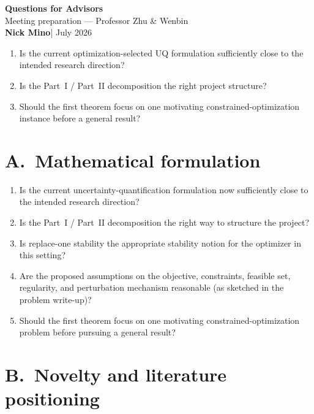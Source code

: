 \documentclass[11pt]{article}
\begin{document}
\begin{center}
{\LARGE\bfseries\color{navy} Questions for Advisors}\\[3pt]
{\normalsize\color{slate} Meeting preparation --- Professor Zhu \& Wenbin}\\[2pt]
{\small\textbf{Nick Mino}\quad\textcolor{accent}{|} July 2026}
\end{center}

\vspace{2pt}

\begin{tcolorbox}[prioritybox, title=Top three (please prioritize)]
\begin{enumerate}[leftmargin=1.4em,itemsep=2pt]
  \item Is the current optimization-selected UQ formulation sufficiently close to the intended research direction?
  \item Is the Part~I / Part~II decomposition the right project structure?
  \item Should the first theorem focus on one motivating constrained-optimization instance before a general result?
\end{enumerate}
\end{tcolorbox}

\section*{A.\ Mathematical formulation}

\begin{enumerate}[leftmargin=1.4em,itemsep=1.5pt]
  \item Is the current uncertainty-quantification formulation now sufficiently close to the intended research direction?
  \item Is the Part~I / Part~II decomposition the right way to structure the project?
  \item Is replace-one stability the appropriate stability notion for the optimizer in this setting?
  \item Are the proposed assumptions on the objective, constraints, feasible set, regularity, and perturbation mechanism reasonable (as sketched in the problem write-up)?
  \item Should the first theorem focus on one motivating constrained-optimization problem before pursuing a general result?
\end{enumerate}

\section*{B.\ Novelty and literature positioning}
\end{document}
